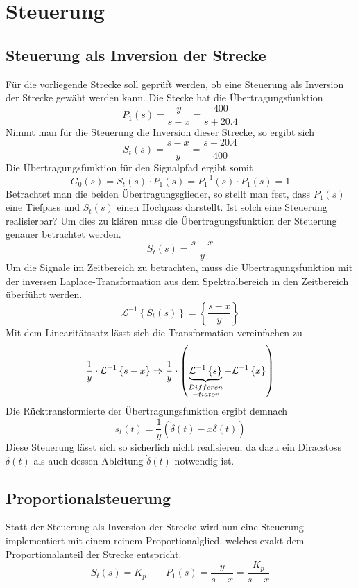 \section{Steuerung}

\subsection{Steuerung als Inversion der Strecke}
Für die vorliegende Strecke soll geprüft werden, ob eine Steuerung als
Inversion der Strecke gewäht werden kann. Die Stecke hat die
Übertragungsfunktion
\[
	P_1(s) = \frac{y}{s-x} = \frac{400}{s + 20.4}
\]
Nimmt man für die Steuerung die Inversion dieser Strecke, so ergibt sich
\[
	S_t(s) = \frac{s-x}{y} = \frac{s + 20.4}{400}
\]
Die Übertragungsfunktion für den Signalpfad ergibt somit
\[
	G_0(s) = S_t(s) \cdot P_1(s) = P_1^{-1}(s) \cdot P_1(s) = 1
\]
Betrachtet man die beiden Übertragungsglieder, so stellt man fest, dass 
$P_1(s)$ eine Tiefpass und $S_t(s)$ einen Hochpass darstellt. Ist solch
eine Steuerung realisierbar? Um dies zu klären muss die Übertragungsfunktion
der Steuerung genauer betrachtet werden.
\[
	S_t(s) = \frac{s-x}{y}
\]
Um die Signale im Zeitbereich zu betrachten, muss die Übertragungsfunktion
mit der inversen Laplace-Transformation aus dem Spektralbereich in den
Zeitbereich überführt werden.
\[
	\mathcal{L}^{-1} \left\{ S_t(s) \right\}
	= \left\{ \frac{s-x}{y} \right\}
\]
Mit dem Linearitätssatz lässt sich die Transformation vereinfachen zu
\[
	\frac{1}{y} \cdot \mathcal{L}^{-1} \left\{ s-x \right\}
	\Rightarrow
	\frac{1}{y} \cdot \left(
		\underbrace{\mathcal{L}^{-1} \left\{ s \right\}}_{
			\begin{subarray}{c}Differen\\-tiator\end{subarray}}
		- \mathcal{L}^{-1} \left\{ x \right\}
	\right)
\]
Die Rücktransformierte der Übertragungsfunktion ergibt demnach
\[
	s_t(t) = \frac{1}{y} \left( \dot\delta(t) - x\delta(t) \right)
\]
Diese Steuerung lässt sich so sicherlich nicht realisieren, da dazu ein
Diracstoss $\delta(t)$ als auch dessen Ableitung $\dot\delta(t)$ notwendig
ist.

\subsection{Proportionalsteuerung}
Statt der Steuerung als Inversion der Strecke wird nun eine Steuerung
implementiert mit einem reinem Proportionalglied, welches exakt dem 
Proportionalanteil der Strecke entspricht.
\[
	S_t(s) = K_p \qquad  P_1(s) = \frac{y}{s-x} = \frac{K_p}{s-x}
\]

